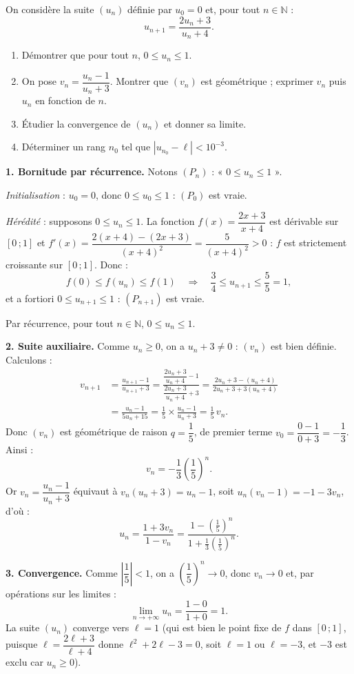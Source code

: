 \documentclass[11pt]{article}
\begin{document}
\begin{exoresolu}
On considère la suite $(u_n)$ définie par $u_0 = 0$ et, pour tout $n \in \mathbb{N}$ :
\[ u_{n+1} = \frac{2u_n + 3}{u_n + 4}. \]
\begin{enumerate}
\item Démontrer que pour tout $n$, $0 \le u_n \le 1$.
\item On pose $v_n = \dfrac{u_n - 1}{u_n + 3}$. Montrer que $(v_n)$ est géométrique ; exprimer $v_n$ puis $u_n$ en fonction de $n$.
\item Étudier la convergence de $(u_n)$ et donner sa limite.
\item Déterminer un rang $n_0$ tel que $|u_{n_0} - \ell| < 10^{-3}$.
\end{enumerate}
\tcblower
\textbf{1. Bornitude par récurrence.} Notons $(P_n)$ : « $0 \le u_n \le 1$ ».

\emph{Initialisation} : $u_0 = 0$, donc $0 \le u_0 \le 1$ : $(P_0)$ est vraie.

\emph{Hérédité} : supposons $0 \le u_n \le 1$. La fonction $f(x) = \dfrac{2x+3}{x+4}$ est dérivable sur $[0\,;1]$ et $f'(x) = \dfrac{2(x+4) - (2x+3)}{(x+4)^2} = \dfrac{5}{(x+4)^2} > 0$ : $f$ est strictement croissante sur $[0\,;1]$. Donc :
\[ f(0) \le f(u_n) \le f(1) \quad\Longrightarrow\quad \frac{3}{4} \le u_{n+1} \le \frac{5}{5} = 1, \]
et a fortiori $0 \le u_{n+1} \le 1$ : $(P_{n+1})$ est vraie.

Par récurrence, pour tout $n \in \mathbb{N}$, $0 \le u_n \le 1$.

\textbf{2. Suite auxiliaire.} Comme $u_n \ge 0$, on a $u_n + 3 \neq 0$ : $(v_n)$ est bien définie. Calculons :
\begin{align*}
v_{n+1} &= \frac{u_{n+1} - 1}{u_{n+1} + 3}
= \frac{\dfrac{2u_n + 3}{u_n + 4} - 1}{\dfrac{2u_n + 3}{u_n + 4} + 3}
= \frac{2u_n + 3 - (u_n + 4)}{2u_n + 3 + 3(u_n + 4)} \\
&= \frac{u_n - 1}{5u_n + 15}
= \frac{1}{5} \times \frac{u_n - 1}{u_n + 3}
= \frac{1}{5}\,v_n.
\end{align*}
Donc $(v_n)$ est géométrique de raison $q = \dfrac{1}{5}$, de premier terme $v_0 = \dfrac{0 - 1}{0 + 3} = -\dfrac{1}{3}$. Ainsi :
\[ v_n = -\frac{1}{3}\left(\frac{1}{5}\right)^n. \]
Or $v_n = \dfrac{u_n - 1}{u_n + 3}$ équivaut à $v_n(u_n + 3) = u_n - 1$, soit $u_n(v_n - 1) = -1 - 3v_n$, d'où :
\[ u_n = \frac{1 + 3v_n}{1 - v_n} = \frac{1 - \left(\frac{1}{5}\right)^n}{1 + \frac{1}{3}\left(\frac{1}{5}\right)^n}. \]

\textbf{3. Convergence.} Comme $\left|\dfrac{1}{5}\right| < 1$, on a $\left(\dfrac{1}{5}\right)^n \to 0$, donc $v_n \to 0$ et, par opérations sur les limites :
\[ \lim_{n \to +\infty} u_n = \frac{1 - 0}{1 + 0} = 1. \]
La suite $(u_n)$ converge vers $\ell = 1$ (qui est bien le point fixe de $f$ dans $[0\,;1]$, puisque $\ell = \dfrac{2\ell+3}{\ell+4}$ donne $\ell^2 + 2\ell - 3 = 0$, soit $\ell = 1$ ou $\ell = -3$, et $-3$ est exclu car $u_n \ge 0$).


\end{exoresolu}
\end{document}
